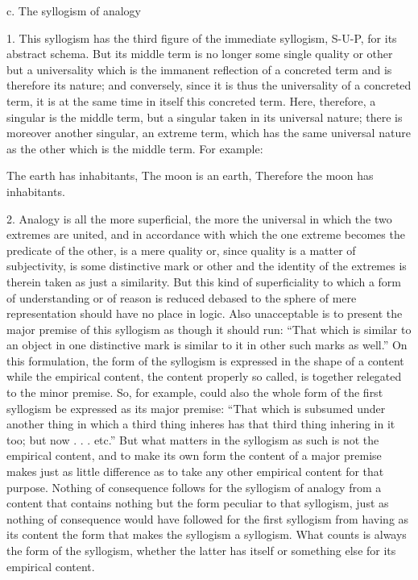 c. The syllogism of analogy

1. This syllogism has the third figure
of the immediate syllogism, S-U-P,
for its abstract schema.
But its middle term is no longer
some single quality or other but a universality
which is the immanent reflection of a concreted term
and is therefore its nature;
and conversely, since it is thus
the universality of a concreted term,
it is at the same time in itself this concreted term.
Here, therefore, a singular is the middle term,
but a singular taken in its universal nature;
there is moreover another singular, an extreme term,
which has the same universal nature as
the other which is the middle term.
For example:

The earth has inhabitants,
The moon is an earth,
Therefore the moon has inhabitants.

2. Analogy is all the more superficial,
the more the universal in which the
two extremes are united,
and in accordance with which the one extreme
becomes the predicate of the other,
is a mere quality or, since quality is a
matter of subjectivity,
is some distinctive mark or other
and the identity of the extremes is therein taken as just a similarity.
But this kind of superficiality to which
a form of understanding or of reason is reduced
debased to the sphere of mere representation should have no place in logic.
Also unacceptable is to present the major premise of this syllogism as though
it should run:
“That which is similar to an object in one distinctive mark
is similar to it in other such marks as well.” On this formulation, the form
of the syllogism is expressed in the shape of a content while the empirical
content, the content properly so called, is together relegated to the minor
premise.
 So, for example, could also the whole form of the first syllogism
be expressed as its major premise: “That which is subsumed under another
thing in which a third thing inheres has that third thing inhering in it
too; but now . . . etc.”
But what matters in the syllogism as such is not the
empirical content, and to make its own form the content of a major premise
makes just as little difference as to take any other empirical content for that
purpose.
Nothing of consequence follows for the syllogism of analogy from
a content that contains nothing but the form peculiar to that syllogism,
just as nothing of consequence would have followed for the first syllogism
from having as its content the form that makes the syllogism a syllogism.
What counts is always the form of the syllogism, whether the latter has
itself or something else for its empirical content.
